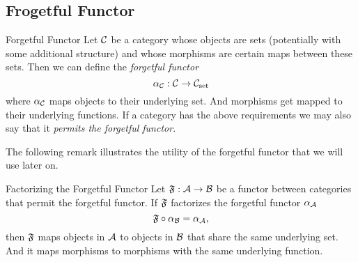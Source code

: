 \subsection{Frogetful Functor}

\begin{definition}{Forgetful Functor}{}
Let $\mathcal{C}$ be a category whose objects are sets (potentially with some additional structure) and whose morphisms are certain maps between these sets. Then we can define the \emph{forgetful functor}
$$
\alpha_{\mathcal{C}}: \mathcal{C} \to \mathcal{C}_\mathrm{set}
$$
where $\alpha_{\mathcal{C}}$ maps objects to their underlying set. And morphisms get mapped to their underlying functions. If a category has the above requirements we may also say that it \emph{permits the forgetful functor}.
\end{definition}
The following remark illustrates the utility of the forgetful functor that we will use later on.
\begin{myremark}{Factorizing the Forgetful Functor}{}
Let $\mathfrak{F}: \mathcal{A} \to \mathcal{B}$ be a functor between categories that permit the forgetful functor. If $\mathfrak{F}$ factorizes the forgetful functor $\alpha_{\mathcal{A}}$ \ie
\begin{equation*}
    \mathfrak{F} \circ \alpha_{\mathcal{B}} = \alpha_{\mathcal{A}},
\end{equation*}
then $\mathfrak{F}$ maps objects in $\mathcal{A}$ to objects in $\mathcal{B}$ that share the same underlying set. And it maps morphisms to morphisms with the same underlying function.
\end{myremark}

